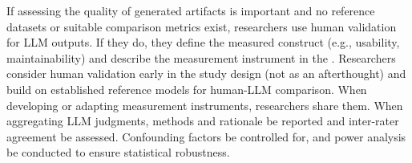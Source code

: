 If assessing the quality of generated artifacts is important and no reference datasets or suitable comparison metrics exist, researchers \should use human validation for LLM outputs. If they do, they \must define the measured construct (e.g., usability, maintainability) and describe the measurement instrument in the \paper. Researchers \should consider human validation early in the study design (not as an afterthought) and build on established reference models for human-LLM comparison. When developing or adapting measurement instruments, researchers \must share them. When aggregating LLM judgments, methods and rationale \should be reported and inter-rater agreement \should be assessed. Confounding factors \should be controlled for, and power analysis \should be conducted to ensure statistical robustness.